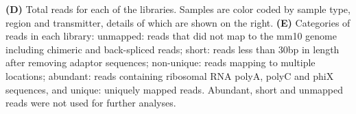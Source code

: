 \textbf{(D)} Total reads for each of the libraries. Samples are color coded by sample type, region and transmitter, details of which are shown on the right. 
\textbf{(E)} Categories of reads in each library: unmapped: reads that did not map to the mm10 genome including chimeric and back-spliced reads; short: reads less than 30bp in length after removing adaptor sequences; non-unique: reads mapping to multiple locations; abundant: reads containing ribosomal RNA polyA, polyC and phiX sequences, and unique: uniquely mapped reads. Abundant, short and unmapped reads were not used for further analyses. 
